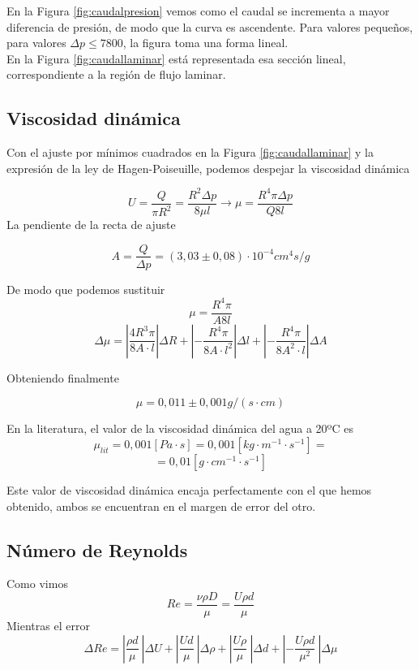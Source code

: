 \documentclass[a4paper,12pt,spanish]{article}
\begin{document}
	En la Figura \ref{fig:caudalpresion} vemos como el caudal se incrementa a mayor diferencia de presión, de modo que la curva es ascendente. Para valores pequeños, para valores $\mathit{\Delta }p \leq 7800$, la figura toma una forma lineal.\\
	
	En la Figura \ref{fig:caudallaminar} está representada esa sección lineal, correspondiente a la región de flujo laminar.
	
	\subsection*{Viscosidad dinámica}
	
	
	Con el ajuste por mínimos cuadrados en la Figura \ref{fig:caudallaminar} y la expresión de la ley de Hagen-Poiseuille, podemos despejar la viscosidad dinámica
	
	
	\[U = \frac{Q}{\pi R^2} = \frac{R^2 \mathit{\Delta} p}{8\mu l} \longrightarrow \mu = \frac{R^4\pi \mathit{\Delta p}}{Q 8 l}
	\] 
	La pendiente de la recta de ajuste
	
	\[A = \frac{Q}{\mathit{\Delta}p} = (3,03 \pm 0,08) \cdot 10^{-4} \si{cm^4 s / g} \]
	
	De modo que podemos sustituir
	\[ \mu = \frac{R^4\pi }{A 8 l}
	\]
	\[ \Delta \mu = \left| \frac{4R^3\pi}{8A\cdot l} 
	\right| \Delta R + \left| -\frac{R^4 \pi }{8A \cdot l^2}
	  \right| \Delta l + \left| -\frac{R^4 \pi}{8 A^2 \cdot l}
	  \right| \Delta A
	\]
	
	Obteniendo finalmente
	
	\[  \mu = 0,011 \pm 0,001 \si{{g}/(s\cdot cm)}
	\]
	
	En la literatura, el valor de la viscosidad dinámica del agua a 20ºC es 
	\[ \mu_{lit} = 0,001 \si{[Pa\cdot s]} = 0,001 \si{[kg\cdot m^{-1}\cdot s^{-1}]} =
	\]
	\[  = 0,01 [\si{g\cdot cm^{-1}\cdot s^{-1}}]
	\]
	
	Este valor de viscosidad dinámica encaja perfectamente con el que hemos obtenido, ambos se encuentran en el margen de error del otro.
	
	
	
	\subsection*{Número de Reynolds}
	
	Como vimos 
	\[Re = \frac{\nu \rho D}{\mu}= \frac{U \rho d}{\mu}\] 
	Mientras el error
	\[ \Delta Re = \left|  \frac{\rho d}{\mu}\
	\right| \Delta U + \left| \frac{U  d}{\mu}\
	\right| \Delta \rho + \left| \frac{U \rho }{\mu}\
	\right| \Delta d + \left| -\frac{U \rho d}{\mu^2}\
	\right| \Delta \mu
	\]
	
\end{document}

